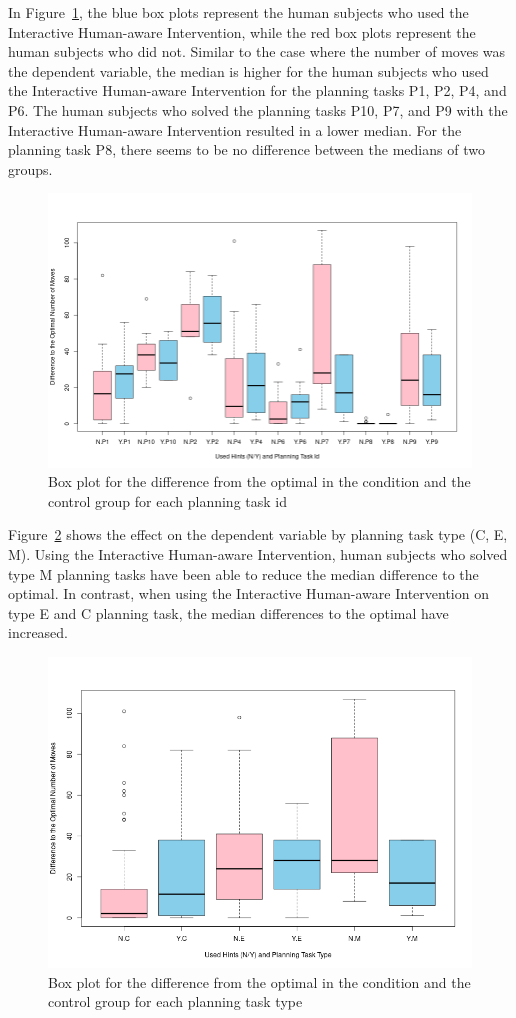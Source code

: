 In Figure~\ref{fig:lenoptbypid}, the blue box plots represent the human subjects who used the Interactive Human-aware Intervention, while the red box plots represent the human subjects who did not.
Similar to the case where the number of moves was the dependent variable, the median is higher for the human subjects who used the Interactive Human-aware Intervention for the planning tasks P1, P2, P4, and P6.
The human subjects who solved the planning tasks P10, P7, and P9 with the Interactive Human-aware Intervention resulted in a lower median.
For the planning task P8, there seems to be no difference between the medians of two groups.
\begin{figure}[tpb]
  \centering
\includegraphics[width=0.9\columnwidth]{img/lenoptbypid.png}
  \caption{Box plot for the difference from the optimal in the condition and the control group for each planning task id}
  \label{fig:lenoptbypid}
\end{figure}

Figure~\ref{fig:lenoptbytype} shows the effect on the  dependent variable by planning task type (C, E, M).
Using the Interactive Human-aware Intervention, human subjects who solved type M planning tasks have been able to reduce the median difference to the optimal.
In contrast, when using the Interactive Human-aware Intervention on type E and C planning task, the median differences to the optimal have increased.

\begin{figure}[tpb]
  \centering
\includegraphics[width=0.7\columnwidth]{img/lenoptbytype.png}
  \caption{Box plot for the difference from the optimal in the condition and the control group for each planning task type}
  \label{fig:lenoptbytype}
\end{figure}


